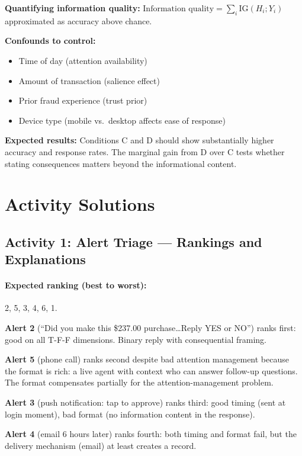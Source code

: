 \textbf{Quantifying information quality:}
$\text{Information quality} = \sum_i \text{IG}(H_i; Y_i)$ approximated as accuracy above chance.

\textbf{Confounds to control:}
\begin{itemize}
    \item Time of day (attention availability)
    \item Amount of transaction (salience effect)
    \item Prior fraud experience (trust prior)
    \item Device type (mobile vs.\ desktop affects ease of response)
\end{itemize}

\textbf{Expected results:} Conditions C and D should show substantially higher accuracy and response rates. The marginal gain from D over C tests whether stating consequences matters beyond the informational content.

\section{Activity Solutions}

\subsection{Activity 1: Alert Triage --- Rankings and Explanations}

\paragraph{Expected ranking (best to worst):} 2, 5, 3, 4, 6, 1.

\textbf{Alert 2} (``Did you make this \$237.00 purchase\ldots Reply YES or NO'') ranks first: good on all T-F-F dimensions. Binary reply with consequential framing.

\textbf{Alert 5} (phone call) ranks second despite bad attention management because the format is rich: a live agent with context who can answer follow-up questions. The format compensates partially for the attention-management problem.

\textbf{Alert 3} (push notification: tap to approve) ranks third: good timing (sent at login moment), bad format (no information content in the response).

\textbf{Alert 4} (email 6 hours later) ranks fourth: both timing and format fail, but the delivery mechanism (email) at least creates a record.


